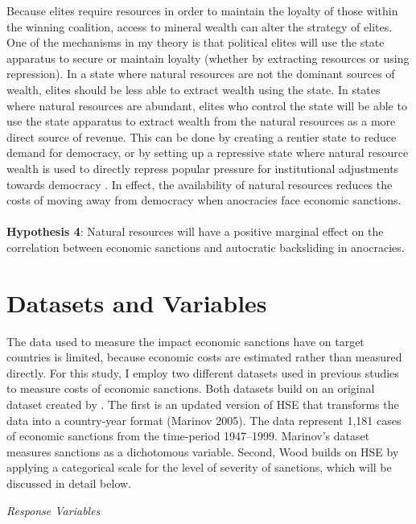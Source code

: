 \documentclass[a4paper]{article}\usepackage[]{graphicx}\usepackage[]{color}
\begin{document}
Because elites require resources in order to maintain the loyalty of those within the winning coalition, access to mineral wealth can alter the strategy of elites. One of the mechanisms in my theory is that political elites will use the state apparatus to secure or maintain loyalty (whether by extracting resources or using repression). In a state where natural resources are not the dominant sources of wealth, elites should be less able to extract wealth using the state. In states where natural resources are abundant, elites who control the state will be able to use the state apparatus to extract wealth from the natural resources as a more direct source of revenue. This can be done by creating a rentier state to reduce demand for democracy, or by setting up a repressive state where natural resource wealth is used to directly repress popular pressure for institutional adjustments towards democracy \citep{ross2001does}. In effect, the availability of natural resources reduces the costs of moving away from democracy when anocracies face economic sanctions.  \\
\\
\textbf{Hypothesis 4}: Natural resources will have a positive marginal effect on the correlation between economic sanctions and autocratic backsliding in anocracies. 


\section*{\large{Datasets and Variables}}

The data used to measure the impact economic sanctions have on target countries is limited, because economic costs are estimated rather than measured directly. For this study, I employ two different datasets used in previous studies to measure costs of economic sanctions. Both datasets build on an original dataset created by \citet[Henceforth \textbf{HSE}]{hufbauer1990economic}. The first is an updated version of HSE that transforms the data into a country-year format (Marinov 2005). The data represent 1,181 cases of economic sanctions from the time-period 1947--1999. Marinov's \citet{marinov2005economic} dataset measures sanctions as a dichotomous variable. Second, Wood \citet{wood2008hand} builds on HSE by applying a categorical scale for the level of severity of sanctions, which will be discussed in detail below.  

\centerline{\textit{Response Variables}}
\end{document}
